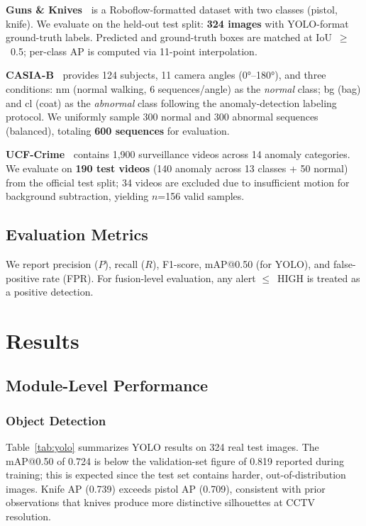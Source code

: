 \documentclass[conference]{IEEEtran}
\begin{document}
\textbf{Guns \& Knives~\cite{gunsknives}} is a Roboflow-formatted dataset
with two classes (pistol, knife).
We evaluate on the held-out test split: \textbf{324 images} with YOLO-format
ground-truth labels.
Predicted and ground-truth boxes are matched at IoU~$\geq$~0.5;
per-class AP is computed via 11-point interpolation.

\textbf{CASIA-B~\cite{casiab}} provides 124 subjects, 11 camera angles
(0°--180°), and three conditions: nm (normal walking, 6 sequences/angle)
as the \emph{normal} class; bg (bag) and cl (coat) as the \emph{abnormal}
class following the anomaly-detection labeling protocol.
We uniformly sample 300 normal and 300 abnormal sequences (balanced),
totaling \textbf{600 sequences} for evaluation.

\textbf{UCF-Crime~\cite{ucfcrime}} contains 1,900 surveillance videos across
14 anomaly categories.
We evaluate on \textbf{190 test videos} (140 anomaly across 13 classes +
50 normal) from the official test split; 34 videos are excluded due to
insufficient motion for background subtraction, yielding $n$=156 valid samples.

\subsection{Evaluation Metrics}

We report precision ($P$), recall ($R$), F1-score, mAP@0.50 (for YOLO), and
false-positive rate (FPR).
For fusion-level evaluation, any alert $\leq$~HIGH is treated as a positive
detection.

\section{Results}\label{sec:results}

\subsection{Module-Level Performance}

\subsubsection{Object Detection}
Table~\ref{tab:yolo} summarizes YOLO results on 324 real test images.
The mAP@0.50 of 0.724 is below the validation-set figure of 0.819 reported
during training; this is expected since the test set contains harder,
out-of-distribution images.
Knife AP (0.739) exceeds pistol AP (0.709), consistent with prior
observations that knives produce more distinctive silhouettes at CCTV
resolution.
\end{document}
